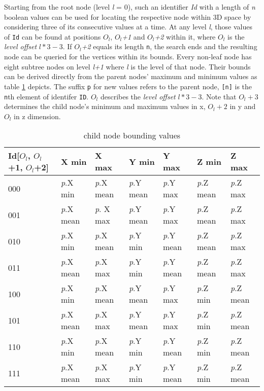 Starting from the root node (level \textit{l} = 0), such an identifier \textit{Id} with a length of \textit{n} boolean values can be used for locating the respective node within 3D space by considering three of its consecutive values at a time. At any level \textit{l}, those  values of \texttt{Id} can be found at positions \textit{$O_l$}, \textit{$O_l$+1} and \textit{$O_l$+2} within it, where $O_l$ is the \textit{level offset} $l*3-3$. If \textit{$O_l$+2} equals its length \texttt{n}, the search ends and the resulting node can be queried for the vertices within its bounds. Every non-leaf node has eight subtree nodes on level \textit{l+1} where \textit{l} is the level of that node. Their bounds can be derived directly from the parent nodes' maximum and minimum values as table \ref{tab:child_node_bounding_values} depicts. The suffix \texttt{p} for new values refers to the parent node, \texttt{[n]} is the \texttt{n}th element of identifer \texttt{ID}. $O_l$ describes the \textit{level offset} $l*3-3$. Note that \texttt{$O_l+3$} determines the child node's minimum and maximum values in x, \texttt{$O_l+2$} in y and \texttt{$O_l$} in z dimension.

\begin{table}[]
\begin{tabular}{l|llllll}
Id{[}$O_l$, $O_l$+1, $O_l$+2{]} & X min & X max & Y min & Y max & Z min & Z max \\ \hline
000 & \textit{p}.X min & \textit{p}.X mean & \textit{p}.Y mean & \textit{p}.Y max & \textit{p}.Z mean & \textit{p}.Z max \\
001 & \textit{p}.X mean & \textit{p}. X max & \textit{p}.Y mean & \textit{p}.Y max & \textit{p}.Z mean & \textit{p}.Z max \\
010 & \textit{p}.X min & \textit{p}.X mean & \textit{p}.Y min & \textit{p}.Y mean & \textit{p}.Z mean & \textit{p}.Z max \\
011 & \textit{p}.X mean & \textit{p}.X max & \textit{p}.Y min & \textit{p}.Y mean & \textit{p}.Z mean & \textit{p}.Z max \\
100 & \textit{p}.X min & \textit{p}.X mean & \textit{p}.Y mean & \textit{p}.Y max & \textit{p}.Z min & \textit{p}.Z mean \\
101 & \textit{p}.X mean & \textit{p}.X max & \textit{p}.Y mean & \textit{p}.Y max & \textit{p}.Z min & \textit{p}.Z mean \\
110 & \textit{p}.X min & \textit{p}.X mean & \textit{p}.Y min & \textit{p}.Y mean & \textit{p}.Z min & \textit{p}.Z mean \\
111 & \textit{p}.X mean & \textit{p}.X max & \textit{p}.Y min & \textit{p}.Y mean & \textit{p}.Z min & \textit{p}.Z mean
\end{tabular}
\caption{child node bounding values}\label{tab:child_node_bounding_values}
\end{table}

